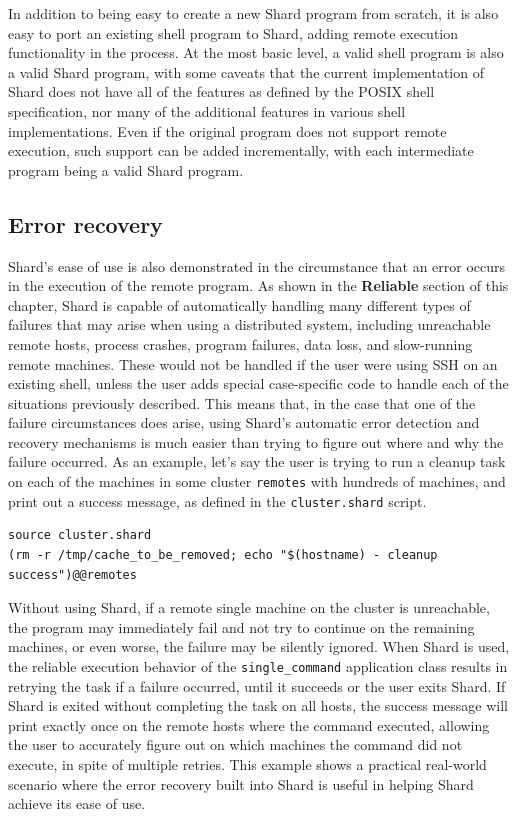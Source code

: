 \documentclass[oneside]{report}
\begin{document}
In addition to being easy to create a new Shard program from scratch, it is also easy to port an existing shell program to Shard, adding remote execution functionality in the process.
At the most basic level, a valid shell program is also a valid Shard program, with some caveats that the current implementation of Shard does not have all of the features as defined by the POSIX shell specification, nor many of the additional features in various shell implementations.
Even if the original program does not support remote execution, such support can be added incrementally, with each intermediate program being a valid Shard program.

\subsection{Error recovery}

Shard's ease of use is also demonstrated in the circumstance that an error occurs in the execution of the remote program.
As shown in the \textbf{Reliable} section of this chapter, Shard is capable of automatically handling many different types of failures that may arise when using a distributed system, including unreachable remote hosts, process crashes, program failures, data loss, and slow-running remote machines.
These would not be handled if the user were using SSH on an existing shell, unless the user adds special case-specific code to handle each of the situations previously described.
This means that, in the case that one of the failure circumstances does arise, using Shard's automatic error detection and recovery mechanisms is much easier than trying to figure out where and why the failure occurred.
As an example, let's say the user is trying to run a cleanup task on each of the machines in some cluster \texttt{remotes} with hundreds of machines, and print out a success message, as defined in the \texttt{cluster.shard} script.

\begin{minipage}[c]{\textwidth-15pt}
  \begin{lstlisting}[language=Shard]
source cluster.shard
(rm -r /tmp/cache_to_be_removed; echo "$(hostname) - cleanup success")@@remotes
\end{lstlisting}
  \smallskip
\end{minipage}

Without using Shard, if a remote single machine on the cluster is unreachable, the program may immediately fail and not try to continue on the remaining machines, or even worse, the failure may be silently ignored.
When Shard is used, the reliable execution behavior of the \texttt{single\_command} application class results in retrying the task if a failure occurred, until it succeeds or the user exits Shard.
If Shard is exited without completing the task on all hosts, the success message will print exactly once on the remote hosts where the command executed, allowing the user to accurately figure out on which machines the command did not execute, in spite of multiple retries.
This example shows a practical real-world scenario where the error recovery built into Shard is useful in helping Shard achieve its ease of use.
\end{document}
